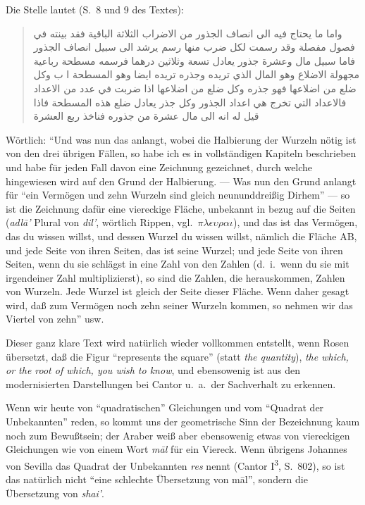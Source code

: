 \documentclass[11pt,a4paper]{article}
\newcommand{\RL}[1]{\beginR#1\endR}
\newcommand{\ar}[1]{{\arabicfont\RL{#1}}}
\newcommand{\enquote}[1]{``#1''}
\begin{document}
Die Stelle lautet (S.\ 8 und 9 des Textes):

\begin{quote}
\ar{واما ما يحتاج فيه الى انصاف الجذور من الاضراب الثلاثة الباقية فقد بينته في فصول مفصلة وقد رسمت لكل ضرب منها رسم يرشد الى سبيل انصاف الجذور فاما سبيل مال وعشرة جذور يعادل تسعة وثلاثين درهما فرسمه مسطحة رباعية مجهولة الاضلاع وهو المال الذي تريده وجذره تريده ايضا وهو المسطحة ا ب وكل ضلع من اضلاعها فهو جذره وكل ضلع من اضلاعها اذا ضربت في عدد من الاعداد فالاعداد التي تخرج هي اعداد الجذور وكل جذر يعادل ضلع هذه المسطحة فاذا قيل له انه الى مال عشرة من جذوره فناخذ ربع العشرة}
\end{quote}

W\"ortlich: \enquote{Und was nun das anlangt, wobei die Halbierung der Wurzeln n\"otig ist von den drei \"ubrigen F\"allen, so habe ich es in vollst\"andigen Kapiteln beschrieben und habe f\"ur jeden Fall davon eine Zeichnung gezeichnet, durch welche hingewiesen wird auf den Grund der Halbierung. --- Was nun den Grund anlangt f\"ur \enquote{ein Verm\"ogen und zehn Wurzeln sind gleich neununddrei\ss{}ig Dirhem} --- so ist die Zeichnung daf\"ur eine viereckige Fl\"ache, unbekannt in bezug auf die Seiten (\textit{adl\=a'} Plural von \textit{dil'}, w\"ortlich Rippen, vgl.\ $\pi\lambda\epsilon\upsilon\rho\alpha\iota$), und das ist das Verm\"ogen, das du wissen willst, und dessen Wurzel du wissen willst, n\"amlich die Fl\"ache AB, und jede Seite von ihren Seiten, das ist seine Wurzel; und jede Seite von ihren Seiten, wenn du sie schl\"agst in eine Zahl von den Zahlen (d.\ i.\ wenn du sie mit irgendeiner Zahl multiplizierst), so sind die Zahlen, die herauskommen, Zahlen von Wurzeln. Jede Wurzel ist gleich der Seite dieser Fl\"ache. Wenn daher gesagt wird, da\ss{} zum Verm\"ogen noch zehn seiner Wurzeln kommen, so nehmen wir das Viertel von zehn} usw.

Dieser ganz klare Text wird nat\"urlich wieder vollkommen entstellt, wenn Rosen \"ubersetzt, da\ss{} die Figur \enquote{represents the square} (statt \textit{the quantity}), \textit{the which, or the root of which, you wish to know}, und ebensowenig ist aus den modernisierten Darstellungen bei Cantor u.\ a.\ der Sachverhalt zu erkennen.

Wenn wir heute von \enquote{quadratischen} Gleichungen und vom \enquote{Quadrat der Unbekannten} reden, so kommt uns der geometrische Sinn der Bezeichnung kaum noch zum Bewu\ss{}tsein; der Araber wei\ss{} aber ebensowenig etwas von viereckigen Gleichungen wie von einem Wort \textit{m\=al} f\"ur ein Viereck. Wenn \"ubrigens Johannes von Sevilla das Quadrat der Unbekannten \textit{res} nennt (Cantor I\textsuperscript{3}, S.\ 802), so ist das nat\"urlich nicht \enquote{eine schlechte \"Ubersetzung von m\=al}, sondern die \"Ubersetzung von \textit{shai'}.
\end{document}
